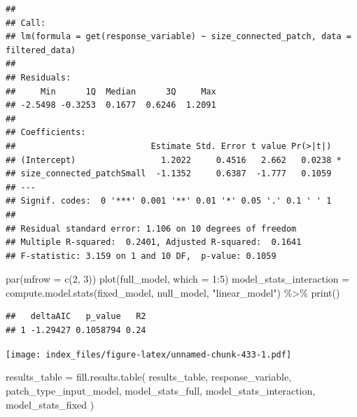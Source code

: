 \documentclass[
]{article}
\newenvironment{Shaded}{\begin{snugshade}}{\end{snugshade}}
\newcommand{\AttributeTok}[1]{\textcolor[rgb]{0.77,0.63,0.00}{#1}}
\newcommand{\DecValTok}[1]{\textcolor[rgb]{0.00,0.00,0.81}{#1}}
\newcommand{\FunctionTok}[1]{\textcolor[rgb]{0.00,0.00,0.00}{#1}}
\newcommand{\NormalTok}[1]{#1}
\newcommand{\OtherTok}[1]{\textcolor[rgb]{0.56,0.35,0.01}{#1}}
\newcommand{\SpecialCharTok}[1]{\textcolor[rgb]{0.00,0.00,0.00}{#1}}
\newcommand{\StringTok}[1]{\textcolor[rgb]{0.31,0.60,0.02}{#1}}
\begin{document}
\begin{verbatim}
## 
## Call:
## lm(formula = get(response_variable) ~ size_connected_patch, data = filtered_data)
## 
## Residuals:
##     Min      1Q  Median      3Q     Max 
## -2.5498 -0.3253  0.1677  0.6246  1.2091 
## 
## Coefficients:
##                           Estimate Std. Error t value Pr(>|t|)  
## (Intercept)                 1.2022     0.4516   2.662   0.0238 *
## size_connected_patchSmall  -1.1352     0.6387  -1.777   0.1059  
## ---
## Signif. codes:  0 '***' 0.001 '**' 0.01 '*' 0.05 '.' 0.1 ' ' 1
## 
## Residual standard error: 1.106 on 10 degrees of freedom
## Multiple R-squared:  0.2401, Adjusted R-squared:  0.1641 
## F-statistic: 3.159 on 1 and 10 DF,  p-value: 0.1059
\end{verbatim}

\begin{Shaded}
\begin{Highlighting}[]
\FunctionTok{par}\NormalTok{(}\AttributeTok{mfrow =} \FunctionTok{c}\NormalTok{(}\DecValTok{2}\NormalTok{, }\DecValTok{3}\NormalTok{))}
\FunctionTok{plot}\NormalTok{(full\_model, }\AttributeTok{which =} \DecValTok{1}\SpecialCharTok{:}\DecValTok{5}\NormalTok{)}
\NormalTok{model\_stats\_interaction }\OtherTok{=} \FunctionTok{compute.model.stats}\NormalTok{(fixed\_model,}
\NormalTok{                                              null\_model,}
                                              \StringTok{"linear\_model"}\NormalTok{) }\SpecialCharTok{\%\textgreater{}\%}
  \FunctionTok{print}\NormalTok{()}
\end{Highlighting}
\end{Shaded}

\begin{verbatim}
##   deltaAIC   p_value   R2
## 1 -1.29427 0.1058794 0.24
\end{verbatim}

\texttt{[image: index\_files/figure-latex/unnamed-chunk-433-1.pdf]}

\begin{Shaded}
\begin{Highlighting}[]
\NormalTok{results\_table }\OtherTok{=} \FunctionTok{fill.results.table}\NormalTok{(}
\NormalTok{  results\_table,}
\NormalTok{  response\_variable,}
\NormalTok{  patch\_type\_input\_model,}
\NormalTok{  model\_stats\_full,}
\NormalTok{  model\_stats\_interaction,}
\NormalTok{  model\_stats\_fixed}
\NormalTok{)}
\end{Highlighting}
\end{Shaded}
\end{document}

